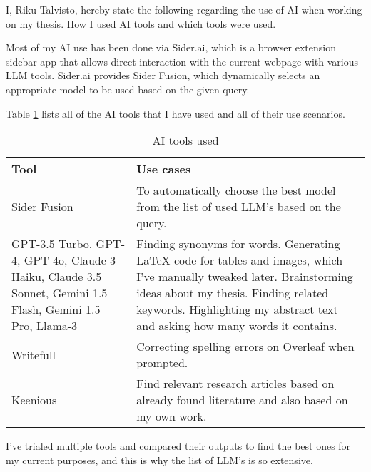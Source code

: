 

I, Riku Talvisto, hereby state the following regarding the use of AI when working on my thesis. How I used AI tools and which tools were used.

Most of my AI use has been done via Sider.ai, which is a browser extension sidebar app that allows direct interaction with the current webpage with various LLM tools. Sider.ai provides Sider Fusion, which dynamically selects an appropriate model to be used based on the given query.

Table \ref{tab:declaration} lists all of the AI tools that I have used and all of their use scenarios.

\begin{table}[h]
  \centering
  \begin{tabular}{m{5cm}m{8cm}}
    \hline
    \textbf{Tool} & \textbf{Use cases} \\
    \hline
    Sider Fusion & To automatically choose the best model from the list of used LLM's based on the query. \\
    \hline
    GPT-3.5 Turbo, GPT-4, GPT-4o, Claude 3 Haiku, Claude 3.5 Sonnet, Gemini 1.5 Flash, Gemini 1.5 Pro, Llama-3 & Finding synonyms for words. Generating LaTeX code for tables and images, which I’ve manually tweaked later. Brainstorming ideas about my thesis. Finding related keywords. Highlighting my abstract text and asking how many words it contains. \\
    \hline
    Writefull & Correcting spelling errors on Overleaf when prompted. \\
    \hline
    Keenious & Find relevant research articles based on already found literature and also based on my own work. \\
    \hline
  \end{tabular}
  \caption{AI tools used}
  \label{tab:declaration}
\end{table}

I've trialed multiple tools and compared their outputs to find the best ones for my current purposes, and this is why the list of LLM's is so extensive.